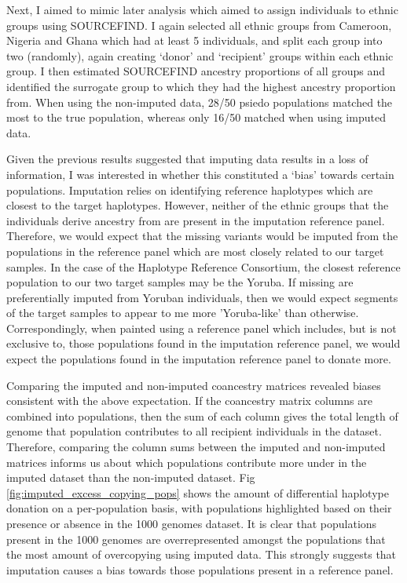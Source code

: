 Next, I aimed to mimic later analysis which aimed to assign individuals to ethnic groups using SOURCEFIND. I again selected all ethnic groups from Cameroon, Nigeria and Ghana which had at least 5 individuals, and split each group into two (randomly), again creating `donor' and `recipient' groups within each ethnic group. I then estimated SOURCEFIND ancestry proportions of all groups and identified the surrogate group to which they had the highest ancestry proportion from. When using the non-imputed data, 28/50 psiedo populations matched the most to the true population, whereas only 16/50 matched when using imputed data. 


Given the previous results suggested that imputing data results in a loss of information, I was interested in whether this constituted a `bias' towards certain populations. Imputation relies on identifying reference haplotypes which are closest to the target haplotypes. However, neither of the ethnic groups that the individuals derive ancestry from are present in the imputation reference panel. Therefore, we would expect that the missing variants would be imputed from the populations in the reference panel which are most closely related to our target samples. In the case of the Haplotype Reference Consortium, the closest reference population to our two target samples may be the Yoruba. If missing are preferentially imputed from Yoruban individuals, then we would expect segments of the target samples to appear to me more 'Yoruba-like' than otherwise. Correspondingly, when painted using a reference panel which includes, but is not exclusive to, those populations found in the imputation reference panel, we would expect the populations found in the imputation reference panel to donate more.

Comparing the imputed and non-imputed coancestry matrices revealed biases consistent with the above expectation. If the coancestry matrix columns are combined into populations, then the sum of each column gives the total length of genome that population contributes to all recipient individuals in the dataset. Therefore, comparing the column sums between the imputed and non-imputed matrices informs us about which populations contribute more under in the imputed dataset than the non-imputed dataset. Fig \ref{fig:imputed_excess_copying_pops} shows the amount of differential haplotype donation on a per-population basis, with populations highlighted based on their presence or absence in the 1000 genomes dataset. It is clear that populations present in the 1000 genomes are overrepresented amongst the populations that the most amount of overcopying using imputed data. This strongly suggests that imputation causes a bias towards those populations present in a reference panel. 

